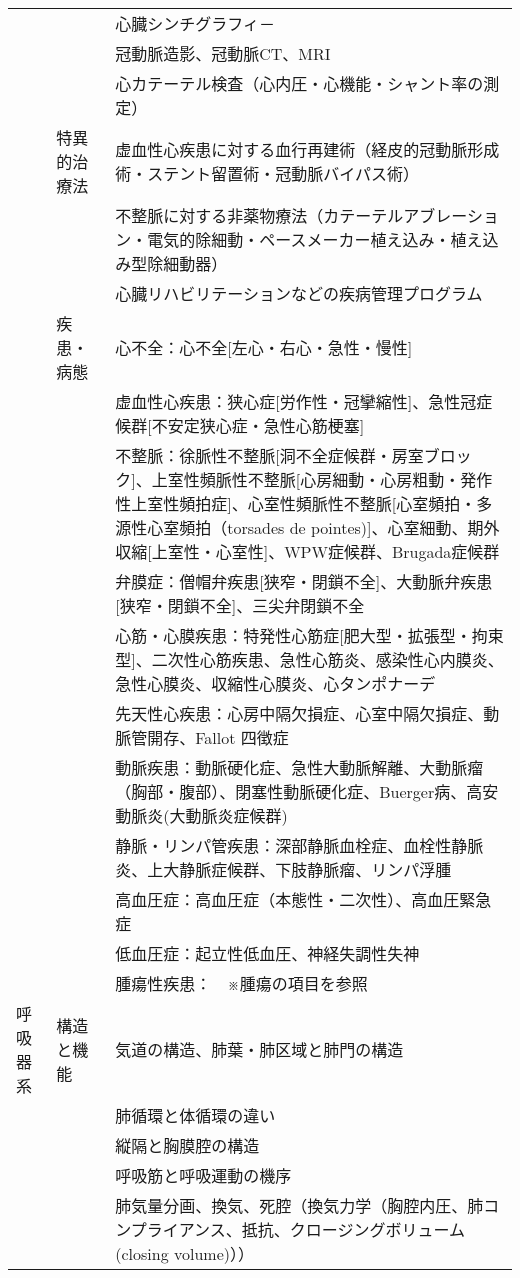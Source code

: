 \begin{xltabular}{\linewidth}{XXX}
 &  & 心臓シンチグラフィ－ \\
 &  & 冠動脈造影、冠動脈CT、MRI \\
 &  & 心カテーテル検査（心内圧・心機能・シャント率の測定） \\
 & 特異的治療法 & 虚血性心疾患に対する血行再建術（経皮的冠動脈形成術・ステント留置術・冠動脈バイパス術） \\
 &  & 不整脈に対する非薬物療法（カテーテルアブレーション・電気的除細動・ペースメーカー植え込み・植え込み型除細動器） \\
 &  & 心臓リハビリテーションなどの疾病管理プログラム \\
 & 疾患・病態 & 心不全：心不全[左心・右心・急性・慢性] \\
 &  & 虚血性心疾患：狭心症[労作性・冠攣縮性]、急性冠症候群[不安定狭心症・急性心筋梗塞] \\
 &  & 不整脈：徐脈性不整脈[洞不全症候群・房室ブロック]、上室性頻脈性不整脈[心房細動・心房粗動・発作性上室性頻拍症]、心室性頻脈性不整脈[心室頻拍・多源性心室頻拍（torsades de pointes)]、心室細動、期外収縮[上室性・心室性]、WPW症候群、Brugada症候群 \\
 &  & 弁膜症：僧帽弁疾患[狭窄・閉鎖不全]、大動脈弁疾患[狭窄・閉鎖不全]、三尖弁閉鎖不全 \\
 &  & 心筋・心膜疾患：特発性心筋症[肥大型・拡張型・拘束型]、二次性心筋疾患、急性心筋炎、感染性心内膜炎、急性心膜炎、収縮性心膜炎、心タンポナーデ \\
 &  & 先天性心疾患：心房中隔欠損症、心室中隔欠損症、動脈管開存、Fallot 四徴症 \\
 &  & 動脈疾患：動脈硬化症、急性大動脈解離、大動脈瘤（胸部・腹部）、閉塞性動脈硬化症、Buerger病、高安動脈炎(大動脈炎症候群) \\
 &  & 静脈・リンパ管疾患：深部静脈血栓症、血栓性静脈炎、上大静脈症候群、下肢静脈瘤、リンパ浮腫 \\
 &  & 高血圧症：高血圧症（本態性・二次性）、高血圧緊急症 \\
 &  & 低血圧症：起立性低血圧、神経失調性失神 \\
 &  & 腫瘍性疾患：　※腫瘍の項目を参照 \\
呼吸器系 & 構造と機能 & 気道の構造、肺葉・肺区域と肺門の構造 \\
 &  & 肺循環と体循環の違い \\
 &  & 縦隔と胸膜腔の構造 \\
 &  & 呼吸筋と呼吸運動の機序 \\
 &  & 肺気量分画、換気、死腔（換気力学（胸腔内圧、肺コンプライアンス、抵抗、クロージングボリューム(closing volume)）） \\

\end{xltabular}
